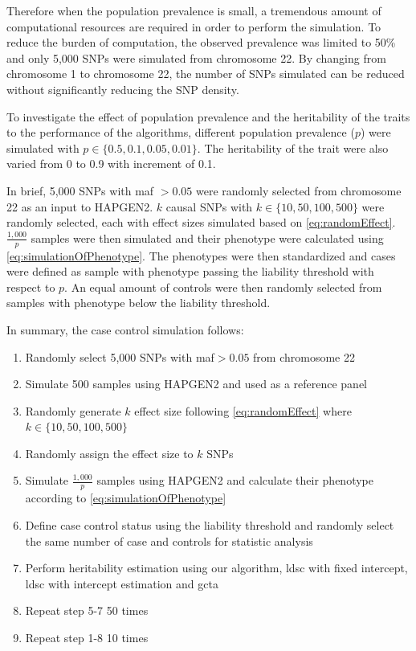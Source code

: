 		Therefore when the population prevalence is small, a tremendous amount of computational resources are required in order to perform the simulation.
		To reduce the burden of computation, the observed prevalence was limited to 50\% and only 5,000 \glspl{SNP} were simulated from chromosome 22.
		By changing from chromosome 1 to chromosome 22, the number of \glspl{SNP} simulated can be reduced without significantly reducing the \gls{SNP} density.
		
		To investigate the effect of population prevalence and the heritability of the traits to the performance of the algorithms, different population prevalence ($p$) were simulated with $p\in\{0.5, 0.1, 0.05, 0.01\}$.
		The heritability of the trait were also varied from 0 to 0.9 with increment of 0.1.

		In brief, 5,000 \glspl{SNP} with \gls{maf} $>0.05$ were randomly selected from chromosome 22 as an input to HAPGEN2. 
		$k$ causal \glspl{SNP} with $k\in\{10,50,100,500\}$ were randomly selected, each with effect sizes simulated based on \cref{eq:randomEffect}.
		$\frac{1,000}{p}$ samples were then simulated and their phenotype were calculated using \cref{eq:simulationOfPhenotype}.
		The phenotypes were then standardized and cases were defined as sample with phenotype passing the liability threshold with respect to $p$.
		An equal amount of controls were then randomly selected from samples with phenotype below the liability threshold.
			
		In summary, the case control simulation follows:
		\begin{enumerate}
			\item Randomly select 5,000 \glspl{SNP} with \gls{maf}$>0.05$ from chromosome 22
			\item Simulate 500 samples using HAPGEN2 and used as a reference panel
			\item Randomly generate $k$ effect size following \cref{eq:randomEffect} where $k\in\{10,50,100,500\}$
			\item Randomly assign the effect size to $k$ \glspl{SNP}
			\item Simulate $\frac{1,000}{p}$ samples using HAPGEN2 and calculate their phenotype according to \cref{eq:simulationOfPhenotype}
			\item Define case control status using the liability threshold and randomly select the same number of case and controls for statistic analysis
			\item Perform heritability estimation using our algorithm, \gls{ldsc} with fixed intercept, \gls{ldsc} with intercept estimation and \gls{gcta}
			\item Repeat step 5-7 50 times
			\item Repeat step 1-8 10 times
		\end{enumerate}
		
